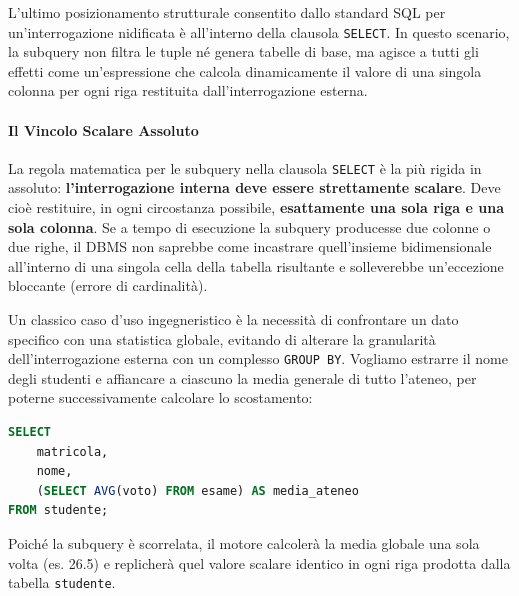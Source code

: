 L'ultimo posizionamento strutturale consentito dallo standard SQL per un'interrogazione nidificata è all'interno della clausola \texttt{SELECT}. In questo scenario, la subquery non filtra le tuple né genera tabelle di base, ma agisce a tutti gli effetti come un'espressione che calcola dinamicamente il valore di una singola colonna per ogni riga restituita dall'interrogazione esterna.

\paragraph{Il Vincolo Scalare Assoluto}
La regola matematica per le subquery nella clausola \texttt{SELECT} è la più rigida in assoluto: \textbf{l'interrogazione interna deve essere strettamente scalare}. Deve cioè restituire, in ogni circostanza possibile, \textbf{esattamente una sola riga e una sola colonna}. Se a tempo di esecuzione la subquery producesse due colonne o due righe, il DBMS non saprebbe come incastrare quell'insieme bidimensionale all'interno di una singola cella della tabella risultante e solleverebbe un'eccezione bloccante (errore di cardinalità).

\begin{example}
Un classico caso d'uso ingegneristico è la necessità di confrontare un dato specifico con una statistica globale, evitando di alterare la granularità dell'interrogazione esterna con un complesso \texttt{GROUP BY}.
Vogliamo estrarre il nome degli studenti e affiancare a ciascuno la media generale di tutto l'ateneo, per poterne successivamente calcolare lo scostamento:

\begin{lstlisting}[language=SQL, basicstyle=\ttfamily\small, keywordstyle=\color{blue}\bfseries]
SELECT 
    matricola, 
    nome, 
    (SELECT AVG(voto) FROM esame) AS media_ateneo
FROM studente;
\end{lstlisting}
Poiché la subquery è scorrelata, il motore calcolerà la media globale una sola volta (es. 26.5) e replicherà quel valore scalare identico in ogni riga prodotta dalla tabella \texttt{studente}.
\end{example}

